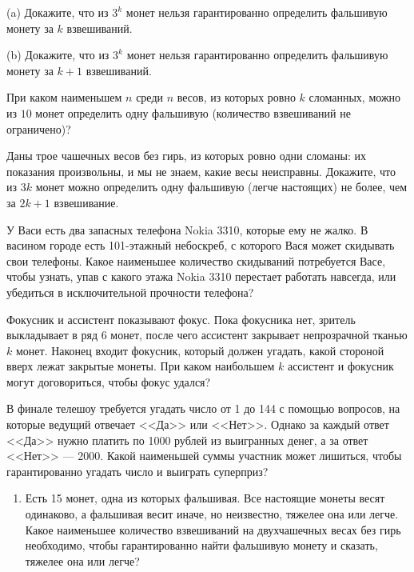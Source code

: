 \documentclass{article}
\begin{document}
\begin{enumerate_boxed}
        (a) Докажите, что из $3^k$ монет нельзя гарантированно определить фальшивую монету за $k$ взвешиваний.

        (b) Докажите, что из $3^k$ монет нельзя гарантированно определить фальшивую монету за $k + 1$ взвешиваний.

        \item При каком наименьшем $n$ среди $n$ весов, из которых ровно $k$ сломанных, можно из $10$ монет определить одну фальшивую (количество взвешиваний не ограничено)?

        \item Даны трое чашечных весов без гирь, из которых ровно одни сломаны: их показания произвольны, и мы не знаем, какие весы неисправны.
        Докажите, что из $3k$ монет можно определить одну фальшивую (легче настоящих) не более, чем за $2k + 1$ взвешивание.

        \item У Васи есть два запасных телефона Nokia 3310, которые ему не жалко.
        В васином городе есть 101-этажный небоскреб, с которого Вася может скидывать свои телефоны.
        Какое наименьшее количество скидываний потребуется Васе, чтобы узнать, упав с какого этажа Nokia 3310 перестает работать навсегда, или убедиться в исключительной прочности телефона?

        \item Фокусник и ассистент показывают фокус.
        Пока фокусника нет, зритель выкладывает в ряд 6 монет, после чего ассистент закрывает непрозрачной тканью $k$ монет.
        Наконец входит фокусник, который должен угадать, какой стороной вверх лежат закрытые монеты.
        При каком наибольшем $k$ ассистент и фокусник могут договориться, чтобы фокус удался?

        \item В финале телешоу требуется угадать число от 1 до 144 с помощью вопросов, на которые ведущий отвечает <<Да>> или <<Нет>>.
        Однако за каждый ответ <<Да>> нужно платить по 1000 рублей из выигранных денег, а за ответ <<Нет>> --- 2000.
        Какой наименьшей суммы участник может лишиться, чтобы гарантированно угадать число и выиграть суперприз?

        \item
        \begin{enumerate}

            \item Есть 15 монет, одна из которых фальшивая.
            Все настоящие монеты весят одинаково, а фальшивая весит иначе, но неизвестно, тяжелее она или легче.
            Какое наименьшее количество взвешиваний на двухчашечных весах без гирь необходимо, чтобы гарантированно найти фальшивую монету и сказать, тяжелее она или легче?


\end{enumerate}
\end{enumerate_boxed}
\end{document}
